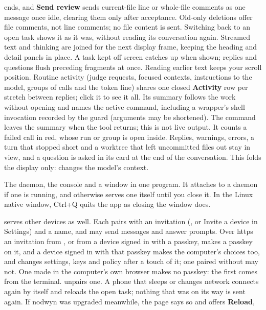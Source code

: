 \begin{description}[leftmargin=2.2em]
  ends, and \textbf{Send review} sends current-file line or whole-file comments
  as one message once idle, clearing them only after acceptance. Old-only
  deletions offer file comments, not line comments; no file content is sent.
  Switching back to an open task shows it
  as it was, without reading its conversation again.
  Streamed text and thinking are joined for the next display frame, keeping
  the heading and detail panels in place. A task kept off screen catches
  up when shown; replies and questions flush preceding fragments at once.
  Reading earlier text keeps your scroll position. Routine activity (judge
  requests, focused contexts, instructions to the model, groups of calls
  and the token line) shares one closed \textbf{Activity} row per stretch
  between replies; click it to see it all. Its summary follows the work
  without opening and names the active command, including a wrapper's
  shell invocation recorded by the guard (arguments may be shortened).
  The command leaves the summary when the tool returns; this is not live
  output. It counts a failed call in red, whose run or group is open inside.
  Replies, warnings, errors, a turn that stopped short and a
  worktree that left uncommitted files out stay in view, and a question is
  asked in its card at the end of the conversation. This folds the display
  only:  changes the model's context.
\item[\code{nodwyn app}] The daemon, the console and a window in one
  program. It attaches to a daemon if one is running, and otherwise serves
  one itself until you close it. In the Linux native window, Ctrl+Q quits
  the app as closing the window does.
\item[A phone]  serves other devices as well.
  Each pairs with an invitation (, or Invite a
  device in Settings) and a name, and may send messages and answer prompts.
  Over https an invitation from , or from a
  device signed in with a passkey, makes a passkey on it, and a device
  signed in with that passkey makes the computer's choices too, and changes
  settings, keys and policy after a touch of it; one paired without may not.
  One made in the computer's own browser makes no passkey: the first comes
  from the terminal.
   unpairs one.
  A phone that sleeps or changes network connects again by itself and
  reloads the open task; nothing that was on its way is sent again. If
  nodwyn was upgraded meanwhile, the page says so and offers \textbf{Reload},

\end{description}
